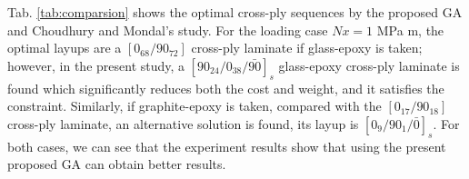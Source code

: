 
Tab. \ref{tab:comparsion} shows the optimal cross-ply sequences by the
proposed GA and  Choudhury and Mondal's\cite{choudhury2019failure} study. For
the loading case $Nx=1$ MPa m, the optimal layups are a $[0_{68}/90_{72}]$
cross-ply laminate if glass-epoxy is taken; however, in the present study, a
$[90_{24}/0_{38}/\bar{90}]_s$ glass-epoxy cross-ply laminate is found which
significantly reduces both the cost and weight, and it satisfies the
constraint.  Similarly, if graphite-epoxy is taken, compared with the
$[0_{17}/90_{18}]$ cross-ply laminate, an alternative solution is found,
its layup is $[0_{9}/90_{1}/\bar{0}]_s$. For both cases, we can see that the
experiment results show that using the present proposed GA can obtain better
results.
